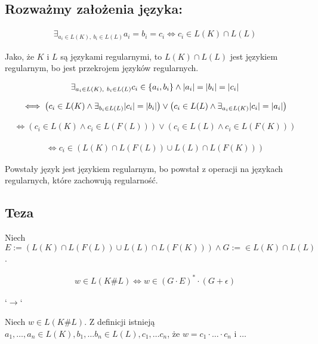 \documentclass{article}
\theoremstyle{definition}
\theoremstyle{remark}
\begin{document}
\subsection{Rozważmy założenia języka:}

\begin{align*}
    \exists_{ a_i \in L(K), \ b_i \in L(L)} { a_i = b_i = c_i }\iff c_i \in L(K) \cap L(L)
\end{align*}

Jako, że \(K\) i \(L\) są językami regularnymi, to \(L(K) \cap L(L)\) jest językiem regularnym, bo jest przekrojem języków regularnych.


\begin{align*}
\exists_{ a_i \in L(K), \ b_i \in L(L)} { c_i \in \left\{ a_i, b_i \right\} \land \abs{a_i}=\abs{b_i}=\abs{c_i} }
\end{align*}

\begin{align*}
\iff
\left( c_i \in L(K) \land \exists_{ b_i \in L(L) }{ \abs{c_i} = \abs{b_i} } \right) \lor \left( c_i \in L(L) \land \exists_{ a_i \in L(K) }{ \abs{c_i} = \abs{a_i} } \right)
\end{align*}

\begin{align*}
    \iff
    \left( c_i \in L(K) \land c_i \in L(F(L)) \right) \lor \left( c_i \in L(L) \land c_i \in L(F(K)) \right)
\end{align*}

\begin{align*}
    \iff
    c_i \in \left( L(K) \cap L(F(L)) \cup L(L) \cap L(F(K)) \right)
\end{align*}

Powstały język jest językiem regularnym, bo powstał z operacji na językach regularnych, które zachowują regularność.

\subsection{Teza}

Niech \( E := \left( L(K) \cap L(F(L)) \cup L(L) \cap L(F(K)) \right) \land G := \in L(K) \cap L(L) \).

\begin{align*}
    w \in L(K \# L) \iff w \in \left( G \cdot E \right)^* \cdot \left( G + \epsilon \right)
\end{align*}

`\( \rightarrow \)`

Niech \(w \in L(K \# L)\). Z definicji istnieją \(a_1, \ldots , a_n \in L(K), b_1, \ldots b_n \in L(L), c_1, \ldots c_n\), że \(w = c_1 \cdot \ldots \cdot c_n\) i \(\ldots\)
\end{document}
